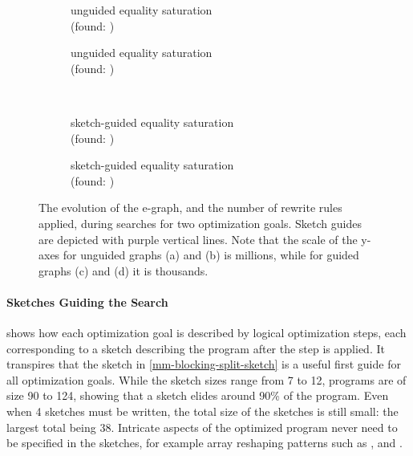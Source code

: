 \begin{figure}
\captionsetup{justification=centering}
    \centering
    \begin{subfigure}[b]{0.49\linewidth}
    \centering
    \resizebox{!}{8em}{}
    \caption{unguided equality saturation\\ \blocking{} (found: \yes)}
    \end{subfigure}
    \begin{subfigure}[b]{0.49\linewidth}
    \resizebox{!}{8em}{}
    \caption{unguided equality saturation\\ \parallel{} (found: {\color{red}\no})}
    \end{subfigure}\\
    \begin{subfigure}[b]{0.49\linewidth}
    \centering
    \resizebox{!}{8em}{}
    \caption{sketch-guided equality saturation\\ \blocking{} (found: \yes)}
    \end{subfigure}
    \begin{subfigure}[b]{0.49\linewidth}
    \resizebox{!}{8em}{}
    \caption{sketch-guided equality saturation\\ \parallel{} (found: \yes)}
    \end{subfigure}
\captionsetup{justification=justified, singlelinecheck=off}
    \caption{The evolution of the e-graph, and the number of rewrite rules applied, during searches for two optimization goals.
    Sketch guides are depicted with purple vertical lines.
    Note that the scale of the y-axes for unguided graphs (a) and (b) is millions, while for guided graphs (c) and (d) it is thousands.}
    \label{fig:evolution-over-iterations}
\end{figure}

\paragraph{Sketches Guiding the Search}
 shows how each optimization goal is described by logical optimization steps, each corresponding to a sketch describing the program after the step is applied.
It transpires that the  sketch in \cref{mm-blocking-split-sketch} is a useful first guide for all optimization goals.
While the sketch sizes range from 7 to 12, programs are of size 90 to 124, showing that a sketch elides around 90\% of the program.
Even when 4 sketches must be written, the total size of the sketches is still small: the largest total being 38.
Intricate aspects of the optimized program never need to be specified in the sketches, for example array reshaping patterns such as ,  and .

